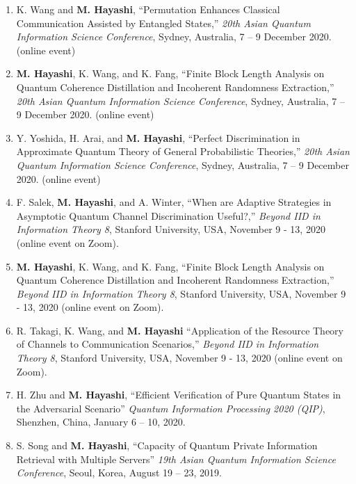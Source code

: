 \documentclass[a4paper,12pt,oneside]{article}
\begin{document}
\begin{enumerate}
\item
K. Wang and \textbf{M. Hayashi},
``Permutation Enhances Classical Communication Assisted by Entangled States,''
{\em 20th Asian Quantum Information Science Conference},
Sydney, Australia, 7 -- 9 December 2020. (online event)

\item
\textbf{M. Hayashi}, K. Wang, and K. Fang,
``Finite Block Length Analysis on Quantum Coherence Distillation and Incoherent Randomness Extraction,''
{\em 20th Asian Quantum Information Science Conference},
Sydney, Australia, 7 -- 9 December 2020. (online event)

\item
Y. Yoshida, H. Arai, and \textbf{M. Hayashi},
``Perfect Discrimination in Approximate Quantum Theory of General Probabilistic Theories,''
{\em 20th Asian Quantum Information Science Conference},
Sydney, Australia, 7 -- 9 December 2020. (online event)

\item
F. Salek, \textbf{M. Hayashi}, and A. Winter,
``When are Adaptive Strategies in Asymptotic Quantum Channel Discrimination Useful?,''
{\em Beyond IID in Information Theory 8}, Stanford University, USA, November 9 - 13, 2020 (online event on Zoom).

\item
\textbf{M. Hayashi}, K. Wang, and K. Fang,
``Finite Block Length Analysis on Quantum Coherence Distillation and Incoherent Randomness Extraction,''
{\em Beyond IID in Information Theory 8}, Stanford University, USA, November 9 - 13, 2020 (online event on Zoom).

\item
R. Takagi, K. Wang, and \textbf{M. Hayashi} 
``Application of the Resource Theory of Channels to Communication Scenarios,''
{\em Beyond IID in Information Theory 8}, Stanford University, USA, November 9 - 13, 2020 (online event on Zoom).

\item 
H. Zhu and \textbf{M. Hayashi}, 
``Efficient Verification of Pure Quantum States in the Adversarial Scenario''
{\em Quantum Information Processing 2020 (QIP)}, 
Shenzhen, China, January 6 -- 10, 2020.


\item 
S. Song and \textbf{M. Hayashi}, 
``Capacity of Quantum
Private Information Retrieval with Multiple Servers''
{\em 19th Asian Quantum Information Science Conference},
Seoul, Korea, August 19 -- 23, 2019.


\end{enumerate}
\end{document}
